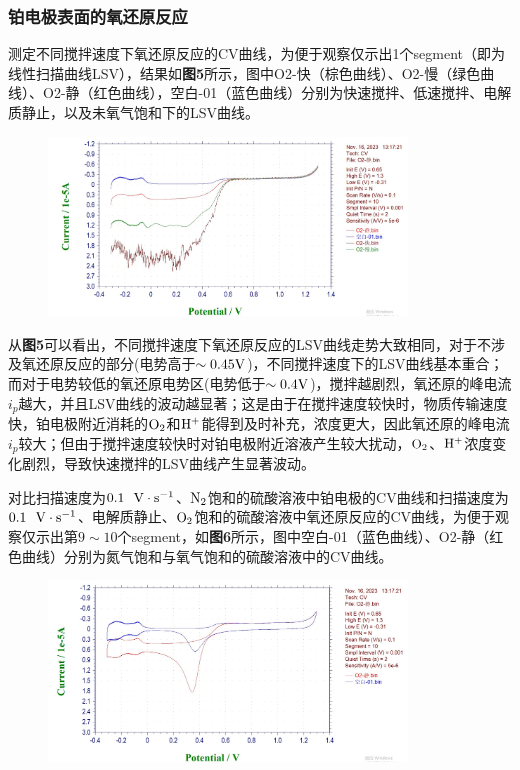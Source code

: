 \documentclass[12pt]{article}
\begin{document}
			\subsubsection{铂电极表面的氧还原反应}
			测定不同搅拌速度下氧还原反应的CV曲线，为便于观察仅示出1个segment（即为线性扫描曲线LSV），结果如\textbf{图5}所示，图中O2-快（棕色曲线）、O2-慢（绿色曲线）、O2-静（红色曲线），空白-01（蓝色曲线）分别为快速搅拌、低速搅拌、电解质静止，以及未氧气饱和下的LSV曲线。\par
			\begin{figure}[h]
				\centering
				\includegraphics[width=0.85\textwidth]{5.png}
			\end{figure}
			\par
			从\textbf{图5}可以看出，不同搅拌速度下氧还原反应的LSV曲线走势大致相同，对于不涉及氧还原反应的部分(电势高于$\sim0.45{\rm V}$)，不同搅拌速度下的LSV曲线基本重合；而对于电势较低的氧还原电势区(电势低于$\sim 0.4{\rm V}$)，搅拌越剧烈，氧还原的峰电流$i_{p}$越大，并且LSV曲线的波动越显著；这是由于在搅拌速度较快时，物质传输速度快，铂电极附近消耗的$\rm O_{2}$和$\rm H^{+}$能得到及时补充，浓度更大，因此氧还原的峰电流$i_{p}$较大；但由于搅拌速度较快时对铂电极附近溶液产生较大扰动，$\rm O_{2}$、$\rm H^{+}$浓度变化剧烈，导致快速搅拌的LSV曲线产生显著波动。\par
			对比扫描速度为$0.1\ \ {\rm V\cdot s^{-1}}$、$\rm N_{2}$饱和的硫酸溶液中铂电极的CV曲线和扫描速度为$0.1\ \ {\rm V\cdot s^{-1}}$、电解质静止、$\rm O_{2}$饱和的硫酸溶液中氧还原反应的CV曲线，为便于观察仅示出第$9\sim 10$个segment，如\textbf{图6}所示，图中空白-01（蓝色曲线）、O2-静（红色曲线）分别为氮气饱和与氧气饱和的硫酸溶液中的CV曲线。
			\begin{figure}[h]
				\centering
				\includegraphics[width=0.85\textwidth]{6.png}
			\end{figure}
\end{document}
